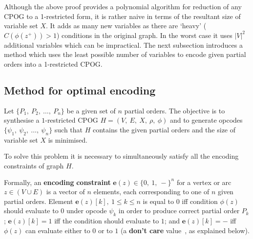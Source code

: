 Although the above proof provides a polynomial algorithm for reduction
of any CPOG to a 1-restricted form, it is rather naive in terms of
the resultant size of variable set $X$. It adds as many new variables
as there are `heavy' ($C(\phi(z^{+}))>1$) conditions in the original
graph. In the worst case it uses $|V|^{2}$ additional variables which
can be impractical. The next subsection introduces a method which
uses the least possible number of variables to encode given partial
orders into a 1-restricted CPOG.


\subsection{Method for optimal encoding\label{sec:Method-for-optimal}
}

Let $\{P_{1},\ P_{2},\ \dots,\ P_{n}\}$ be a given set of $n$ partial
orders. The objective is to synthesise a $1$-restricted CPOG $H=(V,\ E,\ X,\ \rho,\ \phi)$
and to generate opcodes $\{\psi_{1},\ \psi_{2},\ \dots,\ \psi_{n}\}$
such that $H$ contains the given partial orders and the size of variable
set $X$ is minimised.

To solve this problem it is necessary to simultaneously satisfy all
the encoding\emph{ }constraints of graph $H$.

Formally, an \textbf{encoding}\emph{ }\textbf{constraint} $\mathbf{e}(z)\in\{0,\ 1,\ -\}^{n}$
for a vertex or arc $z\in(V\cup E)$ is a vector of $n$ elements,
each corresponding to one of $n$ given partial orders. Element $\mathbf{e}(z)[k],\ 1\le k\le n$
is equal to $0$ iff condition $\phi(z)$ should evaluate to $0$
under opcode $\psi_{k}$ in order to produce correct partial order
$P_{k}$; $\mathbf{e}(z)[k]=1$ iff the condition should evaluate
to $1$; and $\mathbf{e}(z)[k]=-$ iff $\phi(z)$ can evaluate either
to $0$ or to $1$ (a \textbf{don't care} value~\cite{1994_de_micheli_book},
as explained below).

